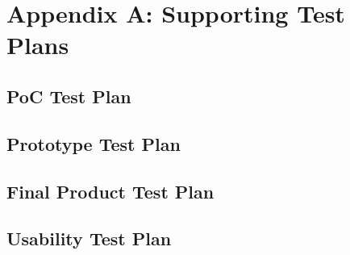 

\setcounter{section}{8}
\section{Appendix A: Supporting Test Plans}
\bigskip


\subsection{PoC Test Plan}

\pagebreak
\subsection{Prototype Test Plan}

\pagebreak
\subsection{Final Product Test Plan}

\pagebreak
\subsection{Usability Test Plan}